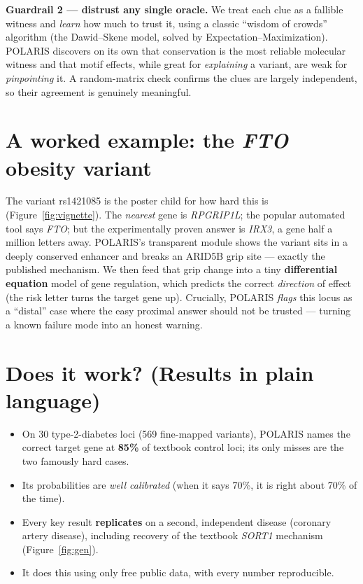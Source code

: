 \documentclass[11pt]{article}
\newcommand{\term}[1]{\textbf{\color{navy}#1}}
\begin{document}
\begin{key}
\textbf{Guardrail 2 --- distrust any single oracle.} We treat each clue as a fallible witness and
\emph{learn} how much to trust it, using a classic ``wisdom of crowds'' algorithm (the Dawid--Skene model,
solved by Expectation--Maximization). POLARIS discovers on its own that conservation is the most reliable
molecular witness and that motif effects, while great for \emph{explaining} a variant, are weak for
\emph{pinpointing} it. A random-matrix check confirms the clues are largely independent, so their agreement
is genuinely meaningful.
\end{key}

\section{A worked example: the \emph{FTO} obesity variant}
The variant rs1421085 is the poster child for how hard this is (Figure~\ref{fig:vignette}). The
\emph{nearest} gene is \emph{RPGRIP1L}; the popular automated tool says \emph{FTO}; but the experimentally
proven answer is \emph{IRX3}, a gene half a million letters away. POLARIS's transparent module shows the
variant sits in a deeply conserved enhancer and breaks an ARID5B grip site --- exactly the published
mechanism. We then feed that grip change into a tiny \term{differential equation} model of gene regulation,
which predicts the correct \emph{direction} of effect (the risk letter turns the target gene up).
Crucially, POLARIS \emph{flags} this locus as a ``distal'' case where the easy proximal answer should not
be trusted --- turning a known failure mode into an honest warning.

\section{Does it work? (Results in plain language)}
\begin{itemize}\setlength\itemsep{1pt}
\item On 30 type-2-diabetes loci (569 fine-mapped variants), POLARIS names the correct target gene at
\textbf{85\%} of textbook control loci; its only misses are the two famously hard cases.
\item Its probabilities are \emph{well calibrated} (when it says 70\%, it is right about 70\% of the time).
\item Every key result \textbf{replicates} on a second, independent disease (coronary artery disease),
including recovery of the textbook \emph{SORT1} mechanism (Figure~\ref{fig:gen}).
\item It does this using only free public data, with every number reproducible.
\end{itemize}
\end{document}
